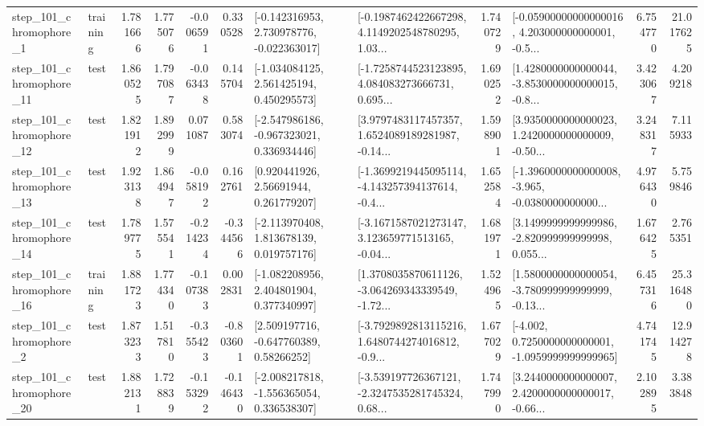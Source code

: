 \begin{tabular}{llrrrrllrlrr}
   step\_101\_chromophore\_1 &  training &      1.781666 &    1.775076 &     -0.006591 &  0.330528 &   [-0.142316953, 2.730978776, -0.022363017] &  [-0.1987462422667298, 4.1149202548780295, 1.03... &       1.740729 &  [-0.05900000000000016, 4.203000000000001, -0.5... &            6.754770 &         21.017625 \\
  step\_101\_chromophore\_11 &      test &      1.860525 &    1.797087 &     -0.063438 &  0.145704 &    [-1.034084125, 2.561425194, 0.450295573] &  [-1.7258744523123895, 4.084083273666731, 0.695... &       1.690252 &  [1.4280000000000044, -3.8530000000000015, -0.8... &            3.423067 &          4.209218 \\
  step\_101\_chromophore\_12 &      test &      1.821912 &    1.892999 &      0.071087 &  0.583074 &   [-2.547986186, -0.967323021, 0.336934446] &  [3.9797483117457357, 1.6524089189281987, -0.14... &       1.598901 &  [3.9350000000000023, 1.2420000000000009, -0.50... &            3.248317 &          7.115933 \\
  step\_101\_chromophore\_13 &      test &      1.923138 &    1.864947 &     -0.058192 &  0.162761 &      [0.920441926, 2.56691944, 0.261779207] &  [-1.3699219445095114, -4.143257394137614, -0.4... &       1.652584 &  [-1.3960000000000008, -3.965, -0.0380000000000... &            4.976430 &          5.759846 \\
  step\_101\_chromophore\_14 &      test &      1.789775 &    1.575541 &     -0.214234 & -0.344566 &    [-2.113970408, 1.813678139, 0.019757176] &  [-3.1671587021273147, 3.123659771513165, -0.04... &       1.681971 &  [3.1499999999999986, -2.820999999999998, 0.055... &            1.676425 &          2.765351 \\
  step\_101\_chromophore\_16 &  training &      1.881723 &    1.774340 &     -0.107383 &  0.002831 &    [-1.082208956, 2.404801904, 0.377340997] &  [1.3708035870611126, -3.064269343339549, -1.72... &       1.524965 &  [1.5800000000000054, -3.780999999999999, -0.13... &            6.457316 &         25.316480 \\
   step\_101\_chromophore\_2 &      test &      1.873233 &    1.517810 &     -0.355423 & -0.803601 &     [2.509197716, -0.647760389, 0.58266252] &  [-3.7929892813115216, 1.6480744274016812, -0.9... &       1.677029 &  [-4.002, 0.7250000000000001, -1.0959999999999965] &            4.741745 &         12.914278 \\
  step\_101\_chromophore\_20 &      test &      1.882131 &    1.728839 &     -0.153292 & -0.146430 &   [-2.008217818, -1.556365054, 0.336538307] &  [-3.539197726367121, -2.3247535281745324, 0.68... &       1.747990 &  [3.2440000000000007, 2.4200000000000017, -0.66... &            2.102895 &          3.383848 \\

\end{tabular}
